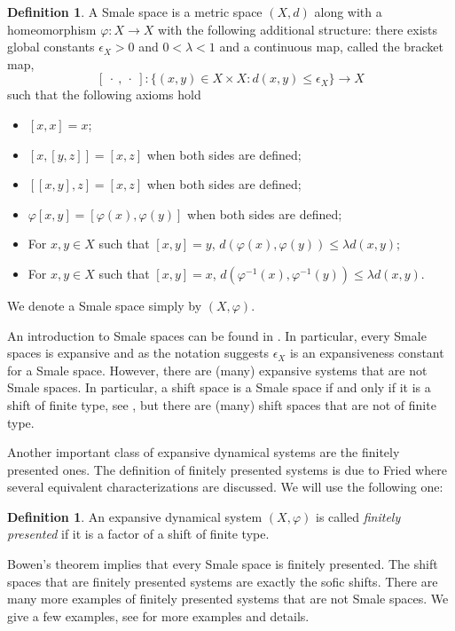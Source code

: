 \documentclass{amsart}
\theoremstyle{plain}
\theoremstyle{definition}
\newtheorem{definition}[theorem]{Definition}
\theoremstyle{remark}
\begin{document}
\begin{definition} \label{SmaSpaDef}
A Smale space is a metric space $(X, d)$ along with a homeomorphism $\varphi: X\rightarrow X$ with the following additional structure: there exists global constants $\epsilon_X>0$ and $0< \lambda < 1$ and a continuous map, called the bracket map, 
\[
[ \ \cdot \  , \ \cdot \ ] :\{(x,y) \in X \times X : d(x,y) \leq \epsilon_X\}\to X
\]
such that the following axioms hold
\begin{itemize}
\item[B1] $\left[ x, x \right] = x$;
\item[B2] $\left[x,[y, z] \right] = [x, z]$ when both sides are defined;
\item[B3] $\left[[x, y], z \right] = [x,z]$ when both sides are defined;
\item[B4] $\varphi[x, y] = [ \varphi(x), \varphi(y)]$ when both sides are defined;
\item[C1] For $x,y \in X$ such that $[x,y]=y$, $d(\varphi(x),\varphi(y)) \leq \lambda d(x,y)$;
\item[C2] For $x,y \in X$ such that $[x,y]=x$, $d(\varphi^{-1}(x),\varphi^{-1}(y)) \leq \lambda d(x,y)$.
\end{itemize}
We denote a Smale space simply by $(X,\varphi)$.
\end{definition}

An introduction to Smale spaces can be found in \cite{ruelle_2004}. In particular, every Smale spaces is expansive and as the notation suggests $\epsilon_X$ is an expansiveness constant for a Smale space. However, there are (many) expansive systems that are not Smale spaces. In particular, a shift space is a Smale space if and only if it is a shift of finite type, see \cite[Theorem 2.2.8]{MR3243636}, but there are (many) shift spaces that are not of finite type.

Another important class of expansive dynamical systems are the finitely presented ones. The definition of finitely presented systems is due to Fried \cite{fried1987} where several equivalent characterizations are discussed. We will use the following one: 

\begin{definition} \label{def:finPreSys}
An expansive dynamical system $(X,\varphi)$ is called \emph{finitely presented} if it is a factor of a shift of finite type.  
\end{definition}

Bowen's theorem \cite{bowen} implies that every Smale space is finitely presented. The shift spaces that are finitely presented systems are exactly the sofic shifts. There are many more examples of finitely presented systems that are not Smale spaces. We give a few examples, see \cite{fried1987} for more examples and details. 
\end{document}
